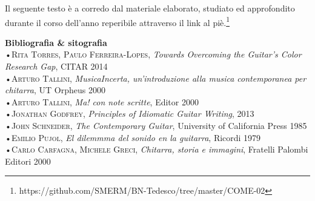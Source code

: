 \documentclass[oneside]{article}
\begin{document}
\begin{multicols*}{2}
Il seguente testo è a corredo dal materiale elaborato, studiato ed approfondito durante il corso dell'anno reperibile attraverso il link al piè.\footnote{https://github.com/SMERM/BN-Tedesco/tree/master/COME-02}

\newpage

\textbf{\textsf{Bibliografia \& sitografia}}\\
•\textsc{\textsf {Rita Torres, Paulo Ferreira-Lopes}}, \emph{Towards Overcoming the Guitar's Color Research Gap}, CITAR 2014\\
•\textsc{\textsf {Arturo Tallini}}, \emph{MusicaIncerta, un'introduzione alla musica contemporanea per chitarra}, UT Orpheus 2000\\
•\textsc{\textsf {Arturo Tallini}}, \emph{Ma! con note scritte}, Editor 2000\\
•\textsc{\textsf {Jonathan Godfrey}}, \emph{Principles of Idiomatic Guitar Writing},  2013\\
•\textsc{\textsf {John Schneider}}, \emph{The Contemporary Guitar},  University of California Press 1985\\
•\textsc{\textsf {Emilio Pujol}}, \emph{El dilemmma del sonido en la guitarra}, Ricordi 1979\\
•\textsc{\textsf {Carlo Carfagna, Michele Greci}}, \emph{Chitarra, storia e immagini}, Fratelli Palombi Editori 2000\\

\hspace*{10mm}



\end{multicols*}
\end{document}
